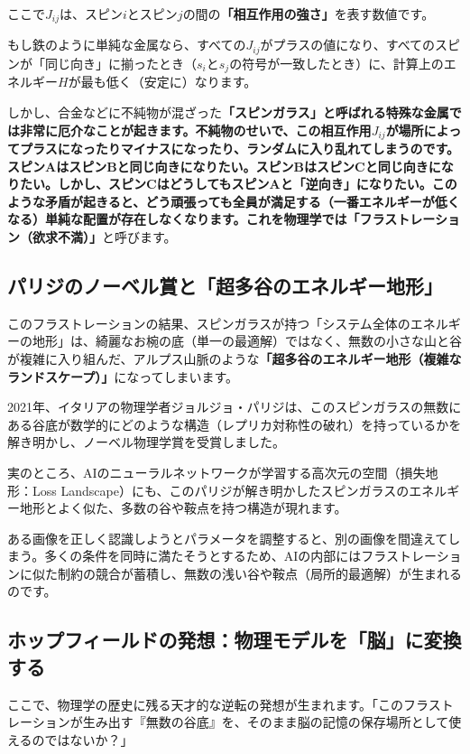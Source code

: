 ここで\(J_{ij}\)は、スピン\(i\)とスピン\(j\)の間の\textbf{「相互作用の強さ」}を表す数値です。

もし鉄のように単純な金属なら、すべての\(J_{ij}\)がプラスの値になり、すべてのスピンが「同じ向き」に揃ったとき（\(s_i\)と\(s_j\)の符号が一致したとき）に、計算上のエネルギー\(H\)が最も低く（安定に）なります。

しかし、合金などに不純物が混ざった\textbf{「スピンガラス」と呼ばれる特殊な金属では非常に厄介なことが起きます。不純物のせいで、この相互作用\(J_{ij}\)が場所によってプラスになったりマイナスになったり、ランダムに入り乱れてしまうのです。 スピンAはスピンBと同じ向きになりたい。スピンBはスピンCと同じ向きになりたい。しかし、スピンCはどうしてもスピンAと「逆向き」になりたい。このような矛盾が起きると、どう頑張っても全員が満足する（一番エネルギーが低くなる）単純な配置が存在しなくなります。これを物理学では「フラストレーション（欲求不満）」}と呼びます。

\subsection{パリジのノーベル賞と「超多谷のエネルギー地形」}

このフラストレーションの結果、スピンガラスが持つ「システム全体のエネルギーの地形」は、綺麗なお椀の底（単一の最適解）ではなく、無数の小さな山と谷が複雑に入り組んだ、アルプス山脈のような\textbf{「超多谷のエネルギー地形（複雑なランドスケープ）」}になってしまいます。

2021年、イタリアの物理学者ジョルジョ・パリジは、このスピンガラスの無数にある谷底が数学的にどのような構造（レプリカ対称性の破れ）を持っているかを解き明かし、ノーベル物理学賞を受賞しました。

実のところ、AIのニューラルネットワークが学習する高次元の空間（損失地形：Loss Landscape）にも、このパリジが解き明かしたスピンガラスのエネルギー地形とよく似た、多数の谷や鞍点を持つ構造が現れます。

ある画像を正しく認識しようとパラメータを調整すると、別の画像を間違えてしまう。多くの条件を同時に満たそうとするため、AIの内部にはフラストレーションに似た制約の競合が蓄積し、無数の浅い谷や鞍点（局所的最適解）が生まれるのです。

\subsection{ホップフィールドの発想：物理モデルを「脳」に変換する}

ここで、物理学の歴史に残る天才的な逆転の発想が生まれます。「このフラストレーションが生み出す『無数の谷底』を、そのまま脳の記憶の保存場所として使えるのではないか？」


